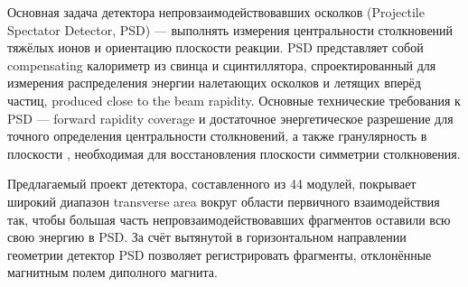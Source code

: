 \begin{minipage}[t]{0.495\textwidth}
Основная задача детектора непровзаимодействовавших осколков (Projectile Spectator Detector, PSD) --- выполнять измерения центральности столкновений тяжёлых ионов и ориентацию плоскости реакции. PSD представляет собой compensating \todo калориметр из свинца и сцинтиллятора, спроектированный для измерения распределения энергии налетающих осколков и летящих вперёд частиц, produced close to the beam rapidity.
Основные технические требования к PSD --- forward rapidity coverage и достаточное энергетическое разрешение для точного определения центральности столкновений, а также гранулярность в плоскости \todo, необходимая для восстановления плоскости симметрии столкновения. \\
\end{minipage}

Предлагаемый проект детектора, составленного из 44 модулей, покрывает широкий диапазон transverse area \todo вокруг области первичного взаимодействия так, чтобы большая часть непровзаимодействовавших фрагментов оставили всю свою энергию в PSD. За счёт вытянутой в горизонтальном направлении геометрии детектор PSD позволяет регистрировать фрагменты, отклонённые магнитным полем диполного магнита.

